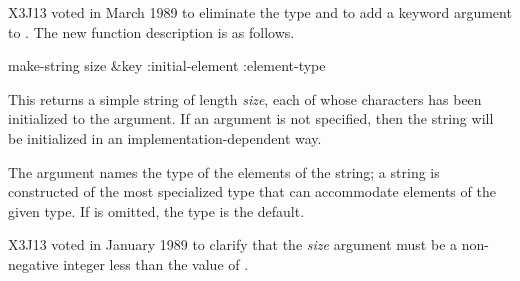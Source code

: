 \begin{newer}
X3J13 voted in March 1989 
to eliminate the type  and to add a keyword
argument  to .  The new function
description is as follows.

\begin{defun}[Function]
make-string size &key :initial-element :element-type

This returns a simple string
of length \emph{size}, each of whose characters
has been initialized to the  argument.
If an  argument is not specified, then the string will
be initialized in an implementation-dependent way.

The  argument names the type of the elements
of the string; a string is constructed of the most specialized type
that can accommodate elements of the given type.  If 
is omitted, the type  is the default.

X3J13 voted in January 1989
to clarify that the \emph{size} argument
must be a non-negative integer less than the value of
.
\end{defun}
\end{newer}



